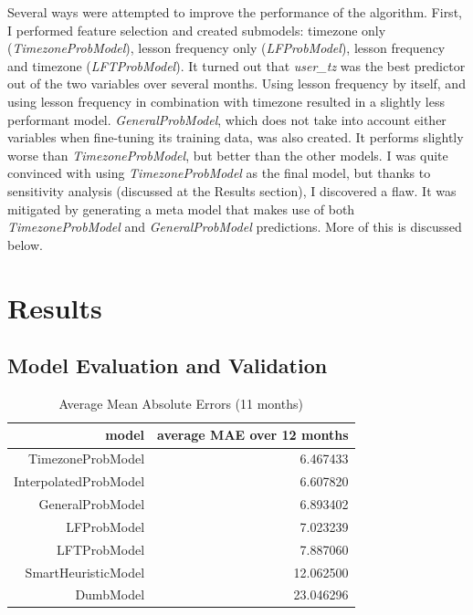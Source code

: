 \documentclass[oneside]{article}
\begin{document}
Several ways were attempted to improve the performance of the algorithm.
First, I performed feature selection and created submodels: timezone only
(\emph{TimezoneProbModel}), lesson frequency only (\emph{LFProbModel}), lesson
frequency and timezone (\emph{LFTProbModel}). It turned out that
\emph{user\_tz} was the best predictor out of the two variables over several
months. Using lesson frequency by itself, and using lesson frequency in
combination with timezone resulted in a slightly less performant model.
\emph{GeneralProbModel}, which does not take into account either variables when
fine-tuning its training data, was also created. It performs slightly worse
than \emph{TimezoneProbModel}, but better than the other models. I was quite
convinced with using \emph{TimezoneProbModel} as the final model, but thanks to
sensitivity analysis (discussed at the Results section), I discovered a flaw.
It was mitigated by generating a meta model that makes use of both
\emph{TimezoneProbModel} and \emph{GeneralProbModel} predictions. More of this
is discussed below.

\section{Results}

\subsection {Model Evaluation and Validation}

\begin{table}[]
  \centering
  \caption{Average Mean Absolute Errors (11 months)}
  \label{tab:avg_mae_of_models}
  \begin{tabular}{rr}
    \textbf{model} & \textbf{average MAE over 12 months} \\
    \hline
    TimezoneProbModel &            6.467433 \\
    InterpolatedProbModel &        6.607820 \\
    GeneralProbModel &             6.893402 \\
    LFProbModel &                  7.023239 \\
    LFTProbModel &                 7.887060 \\
    SmartHeuristicModel &         12.062500 \\
    DumbModel &                   23.046296 \\
    \hline
  \end{tabular}
\end{table}
\end{document}
